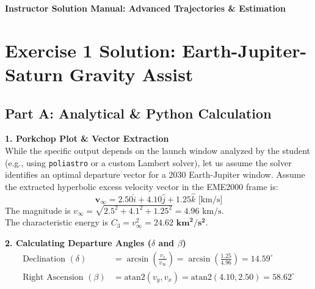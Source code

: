 \documentclass[11pt, letterpaper]{article}
\begin{document}
\begin{center}
    {\Large \textbf{Instructor Solution Manual: Advanced Trajectories \& Estimation}}
\end{center}

\vspace{0.5cm}

\section*{Exercise 1 Solution: Earth-Jupiter-Saturn Gravity Assist}

\subsection*{Part A: Analytical \& Python Calculation}

\textbf{1. Porkchop Plot \& Vector Extraction} \\
While the specific output depends on the launch window analyzed by the student (e.g., using \texttt{poliastro} or a custom Lambert solver), let us assume the solver identifies an optimal departure vector for a 2030 Earth-Jupiter window. 
Assume the extracted hyperbolic excess velocity vector in the EME2000 frame is:
\begin{equation}
    \mathbf{v}_\infty = 2.50 \hat{i} + 4.10 \hat{j} + 1.25 \hat{k} \text{ [km/s]}
\end{equation}
The magnitude is $v_\infty = \sqrt{2.5^2 + 4.1^2 + 1.25^2} = 4.96 \text{ km/s}$. \\
The characteristic energy is $C_3 = v_\infty^2 = \mathbf{24.62 \text{ km}^2/\text{s}^2}$.

\textbf{2. Calculating Departure Angles ($\delta$ and $\beta$)}
\begin{align}
    \text{Declination } (\delta) &= \arcsin\left(\frac{v_z}{v_\infty}\right) = \arcsin\left(\frac{1.25}{4.96}\right) = \mathbf{14.59^\circ} \\
    \text{Right Ascension } (\beta) &= \text{atan2}(v_y, v_x) = \text{atan2}(4.10, 2.50) = \mathbf{58.62^\circ}
\end{align}
\end{document}
